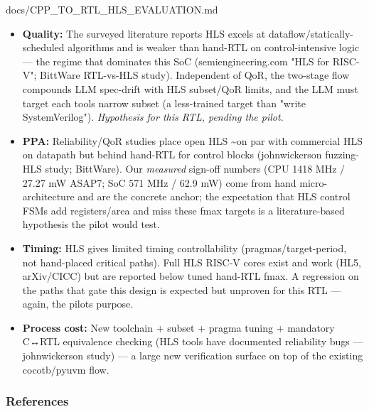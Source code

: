\begin{relocated}{docs/CPP_TO_RTL_HLS_EVALUATION.md}
\begin{itemize}
\tightlist
\item
  \textbf{Quality:} The surveyed literature reports HLS excels at
  dataflow/\allowbreak{}statically-scheduled algorithms and is weaker
  than hand-RTL on control-intensive logic --- the regime that dominates
  this SoC (semiengineering.com "HLS for RISC-V"; BittWare RTL-vs-HLS
  study). Independent of QoR, the two-stage flow compounds LLM
  spec-drift with HLS subset/\allowbreak{}QoR limits, and the LLM must
  target each tool\textquotesingle s narrow subset (a less-trained
  target than "write SystemVerilog"). \emph{Hypothesis for this RTL,
  pending the pilot.}
\item
  \textbf{PPA:} Reliability/\allowbreak{}QoR studies place open HLS
  \textasciitilde on par with commercial HLS on datapath but behind
  hand-RTL for control blocks (johnwickerson fuzzing-HLS study;
  BittWare). Our \emph{measured} sign-off numbers (CPU 1418 MHz / 27.27
  mW ASAP7; SoC 571 MHz / 62.9 mW) come from hand micro-architecture and
  are the concrete anchor; the expectation that HLS control FSMs add
  registers/\allowbreak{}area and miss these fmax targets is a
  literature-based hypothesis the pilot would test.
\item
  \textbf{Timing:} HLS gives limited timing controllability
  (pragmas/\allowbreak{}target-period, not hand-placed critical paths).
  Full HLS RISC-V cores exist and work (HL5,
  arXiv/\allowbreak{}CICC) but are reported below
  tuned hand-RTL fmax. A regression on the paths that gate this design
  is expected but unproven for this RTL --- again, the
  pilot\textquotesingle s purpose.
\item
  \textbf{Process cost:} New toolchain + subset + pragma tuning +
  mandatory C↔RTL equivalence checking (HLS tools have documented
  reliability bugs --- johnwickerson study) --- a large new verification
  surface on top of the existing cocotb/\allowbreak{}pyuvm flow.
\end{itemize}

\subsubsection{References}\label{tm:dec:cpp-to-rtl-hls-evaluation:references}


\end{relocated}

